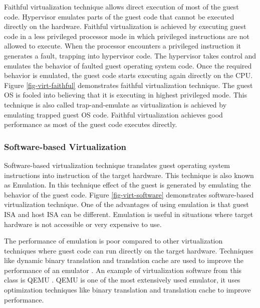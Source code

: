 

Faithful virtualization technique allows direct execution of most of the guest code. 
Hypervisor emulates parts of the guest code that cannot be executed directly on the hardware.
Faithful virtualization is achieved by executing guest code in a less privileged processor mode in which privileged instructions are not allowed to execute. 
When the processor encounters a privileged instruction it generates a fault, trapping into hypervisor code.
The hypervisor takes control and emulates the behavior of faulted guest operating system code. 
Once the required behavior is emulated, the guest code starts executing again directly on the CPU.
Figure \ref{fig-virt-faithful} demonstrates faithful virtualization technique.
The guest OS is fooled into believing that it is executing in highest privileged mode.  
This technique is also called trap-and-emulate as virtualization is achieved by emulating trapped guest OS code.   
Faithful virtualization achieves good performance as most of the guest code executes directly. 


\subsubsection{Software-based Virtualization}
Software-based virtualization technique translates guest operating system instructions into instruction of the target hardware.
This technique is also known as Emulation. 
In this technique effect of the guest is generated by emulating the behavior of the guest code. 
Figure \ref{fig-virt-software} demonstrates software-based virtualization technique.
One of the advantages of using emulation is that guest ISA and host ISA can be different. 
Emulation is useful in situations where target hardware is not accessible or very expensive to use. 


The performance of emulation is poor compared to other virtualization techniques where guest code can run directly on the target hardware. 
Techniques like dynamic binary translation and translation cache are used to improve the performance of an emulator \cite{ebcioglu2001dynamic}.
An example of virtualization software from this class is QEMU \cite{bellard2005qemu}.
QEMU is one of the most extensively used emulator, it uses optimization techniques like binary translation and translation cache to improve performance. 


